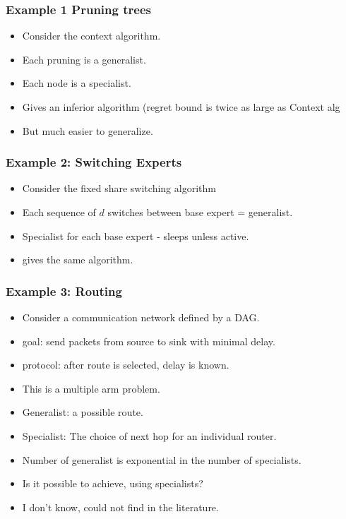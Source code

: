 \documentclass{beamer}
\begin{document}
\begin{small}
\begin{frame}
\frametitle{Example 1 Pruning trees}
\begin{itemize}
\item Consider the context algorithm.
  \item Each pruning is a generalist.
\item Each node is a specialist.
\item Gives an inferior algorithm (regret bound is twice as large as Context alg
  \item But much easier to generalize.
\end{itemize}
\end{frame}

\begin{frame}
  \frametitle{Example 2: Switching Experts}
  \begin{itemize}
  \item Consider the fixed share switching algorithm
  \item Each sequence of $d$ switches between base expert = generalist.
  \item Specialist for each base expert - sleeps unless active.
  \item gives the same algorithm.
  \end{itemize}
\end{frame}

\begin{frame}
  \frametitle{Example 3: Routing}
  \begin{itemize}
  \item Consider a communication network defined by a DAG.
  \item goal: send packets from source to sink with minimal delay.
  \item protocol: after route is selected, delay is known.
  \item This is a multiple arm problem.
  \item Generalist: a possible route.
  \item Specialist: The choice of next hop for an individual router.
  \item Number of generalist is exponential in the number of specialists.
  \item Is it possible to achieve, using specialists?
    \item I don't know, could not find in the literature.
  \end{itemize}
\end{frame}


\iffalse %


\end{small}
\end{document}
